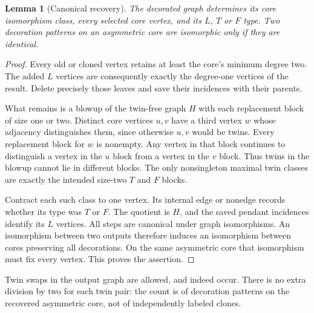 \documentclass[11pt,letterpaper]{article}
\numberwithin{equation}{section}
\newtheorem{lemma}[theorem]{Lemma}
\theoremstyle{definition}\newtheorem{definition}[theorem]{Definition}
\theoremstyle{remark}\newtheorem{remark}[theorem]{Remark}
\begin{document}
\begin{lemma}[Canonical recovery]\label{cgr:ld:lem:recovery}
The decorated graph determines its core isomorphism class, every
selected core vertex, and its $L$, $T$ or $F$ type. Two decoration
patterns on an asymmetric core are isomorphic only if they are
identical.
\end{lemma}
\begin{proof}
Every old or cloned vertex retains at least the core's minimum
degree two. The added $L$ vertices are consequently exactly the
degree-one vertices of the result. Delete precisely those leaves
and save their incidences with their parents.

What remains is a blowup of the twin-free graph $H$ with each
replacement block of size one or two. Distinct core vertices
$u,v$ have a third vertex $w$ whose adjacency distinguishes them,
since otherwise $u,v$ would be twins. Every replacement block
for $w$ is nonempty. Any vertex in that block continues to
distinguish a vertex in the $u$ block from a vertex in the $v$
block. Thus twins in the blowup cannot lie in different blocks.
The only nonsingleton maximal twin classes are exactly the
intended size-two $T$ and $F$ blocks.

Contract each such class to one vertex. Its internal edge or
nonedge records whether its type was $T$ or $F$. The quotient is
$H$, and the saved pendant incidences identify its $L$ vertices.
All steps are canonical under graph isomorphisms. An isomorphism
between two outputs therefore induces an isomorphism between
cores preserving all decorations. On the same asymmetric core
that isomorphism must fix every vertex. This proves the assertion.
\end{proof}

Twin swaps in the output graph are allowed, and indeed occur.
There is no extra division by two for each twin pair: the count
is of decoration patterns on the recovered asymmetric core, not
of independently labeled clones.
\end{document}
